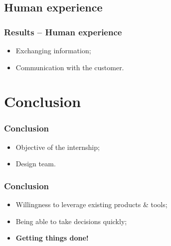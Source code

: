 \documentclass{beamer}
\begin{document}
\subsection{Human experience}

\begin{frame}\frametitle{Results -- Human experience}
\begin{itemize}
\item Exchanging information;
\item Communication with the customer.
\end{itemize}
\end{frame}

\section{Conclusion}

\begin{frame}\frametitle{Conclusion}
\begin{itemize}
\item Objective of the internship;
\item Design team.
\end{itemize}
\end{frame}

\begin{frame}\frametitle{Conclusion}
\begin{itemize}
\item Willingness to leverage existing products \& tools;
\item Being able to take decisions quickly;
\item \textbf{Getting things done!}
\end{itemize}
\end{frame}
\end{document}
